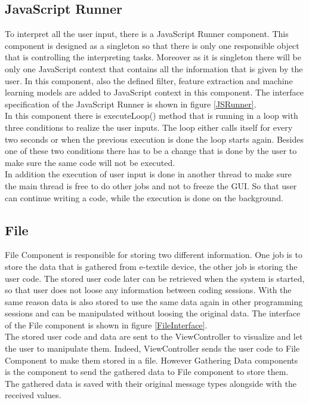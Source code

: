 \subsection{JavaScript Runner}
To interpret all the user input, there is a JavaScript Runner component. This component is designed as a singleton so that there is only one responsible object that is controlling the interpreting tasks. Moreover as it is singleton there will be only one JavaScript context that contains all the information that is given by the user. In this component, also the defined filter, feature extraction and machine learning models are added to JavaScript context in this component. The interface specification of the JavaScript Runner is shown in figure \ref{JSRunner}.\\

In this component there is executeLoop() method that is running in a loop with three conditions to realize the user inputs. The loop either calls itself for every two seconds or when the previous execution is done the loop starts again. Besides one of these two conditions there has to be a change that is done by the user to make sure the same code will not be executed. \\

In addition the execution of user input is done in another thread to make sure the main thread is free to do other jobs and not to freeze the GUI. So that user can continue writing a code, while the execution is done on the background. \\


\subsection{File}
File Component is responsible for storing two different information. One job is to store the data that is gathered from e-textile device, the other job is storing the user code. The stored user code later can be retrieved when the system is started, so that user does not loose any information between coding sessions. With the same reason data is also stored to use the same data again in other programming sessions and can be manipulated without loosing the original data. The interface of the File component is shown in figure \ref{FileInterface}.\\

The stored user code and data are sent to the ViewController to visualize and let the user to manipulate them. Indeed, ViewController sends the user code to File Component to make them stored in a file. However Gathering Data components is the component to send the gathered data to File component to store them. The gathered data is saved with their original message types alongside with the received values. 

